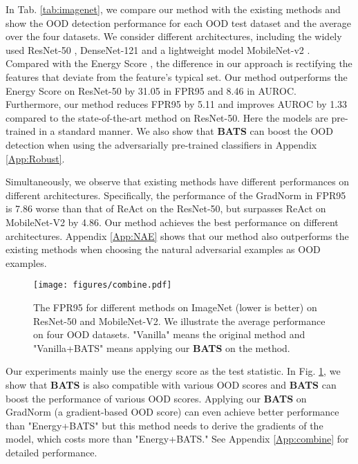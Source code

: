 \documentclass{article}
\begin{document}
In Tab. \ref{tab:imagenet}, we compare our method with the existing methods and show the OOD detection
performance for each OOD test dataset and the average over the four datasets. We consider different architectures, including the widely used ResNet-50 \cite{he2016resnet}, DenseNet-121 \cite{huang2018densenet} and a lightweight model MobileNet-v2 \cite{sandler2019mobilenetv2}. Compared with the Energy Score \cite{liu2020energy}, the difference in our approach is rectifying the features that deviate from the feature's typical set. Our method outperforms the Energy Score on ResNet-50 by 31.05 in FPR95 and 8.46 in AUROC. Furthermore, our method reduces FPR95 by 5.11 and improves AUROC by 1.33 compared to the state-of-the-art method \cite{sun2021react} on ResNet-50. 
{Here the models are pre-trained in a standard manner.}
We also show that \textbf{BATS} can boost the OOD detection when using the adversarially pre-trained classifiers in Appendix \ref{App:Robust}.

Simultaneously, we observe that existing methods have different performances on different architectures. {Specifically}, the performance of the GradNorm \cite{huang2021importance} in FPR95 is 7.86 worse than that of ReAct \cite{sun2021react} on the ResNet-50, but surpasses ReAct on MobileNet-V2 by 4.86. Our method achieves the best performance on different architectures.
Appendix \ref{App:NAE} shows that our method also outperforms the existing methods when choosing the natural adversarial examples \cite{hendrycks2021nae} as OOD examples.


 \begin{figure}[htbp]
\centering
\texttt{[image: figures/combine.pdf]}
\caption{The FPR95 for different methods on ImageNet (lower is better) on ResNet-50 and MobileNet-V2. We illustrate the average performance on four OOD datasets. "Vanilla" means the original method and "Vanilla+BATS" means applying our \textbf{BATS} on the method.}
\label{img:combine}
\end{figure}


Our experiments mainly use the energy score as the test statistic. In Fig. \ref{img:combine}, we show that \textbf{BATS} is also compatible with various OOD scores and \textbf{BATS} can boost the performance of various OOD scores. Applying our \textbf{BATS} on GradNorm \cite{huang2021importance} (a gradient-based OOD score) can even achieve better performance than "Energy+BATS" but this method needs to derive the gradients of the model, which costs more than "Energy+BATS." See Appendix \ref{App:combine} for detailed performance.
\end{document}
